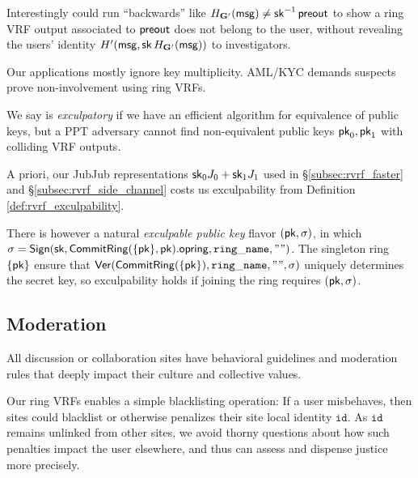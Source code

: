 Interestingly \PedVRF could run ``backwards'' like
 $H_{{\mathbf{G}}'}(\mathsf{msg}) \ne \mathsf{sk}^{-1} \, {\mathsf{preout}}$
to show a ring VRF output associated to ${\mathsf{preout}}$
does not belong to the user, without revealing the users'
identity $H'(\mathsf{msg}, \mathsf{sk} \, H_{{\mathbf{G}}'}(\mathsf{msg}))$ to investigators. 

Our applications mostly ignore key multiplicity. 
AML/KYC demands suspects prove non-involvement using ring VRFs.

\begin{definition}\label{def:rvrf_exculpability}
We say \rVRF is {\em exculpatory} if we have an efficient algorithm
for equivalence of public keys, but a PPT adversary \adv cannot
find non-equivalent public keys $\mathsf{pk}_0,\mathsf{pk}_1$ with colliding VRF outputs.
\end{definition}

A priori, our JubJub representations $\mathsf{sk}_0 J_0 + \mathsf{sk}_1 J_1$
used in \S\ref{subsec:rvrf_faster} and \S\ref{subsec:rvrf_side_channel}
costs us exculpability from Definition \ref{def:rvrf_exculpability}.

There is however a natural {\em exculpable public key} flavor $(\mathsf{pk},\sigma)$,
in which
 $\sigma = {\mathsf{Sign}}(\mathsf{sk}, {\mathsf{CommitRing}}(\{ \mathsf{pk} \},\mathsf{pk}).\mathsf{opring}, \mathtt{ring\_name}, \mathtt{""})$.
The singleton ring $\{ \mathsf{pk} \}$ ensure that 
${\mathsf{Ver}}({\mathsf{CommitRing}}(\{\mathsf{pk}\}), \mathtt{ring\_name}, \mathtt{""}, \sigma)$
uniquely determines the secret key, so exculpability holds
 if joining the ring requires $(\mathsf{pk},\sigma)$.



\subsection{Moderation}
\label{subsec:moderation}

All discussion or collaboration sites have behavioral guidelines and
moderation rules that deeply impact their culture and collective values.

Our ring VRFs enables a simple blacklisting operation:
If a user misbehaves, then sites could blacklist or otherwise penalizes
their site local identity $\mathtt{id}$.
As $\mathtt{id}$ remains unlinked from other sites, we avoid thorny
questions about how such penalties impact the user elsewhere, and thus
can assess and dispense justice more precisely. 

